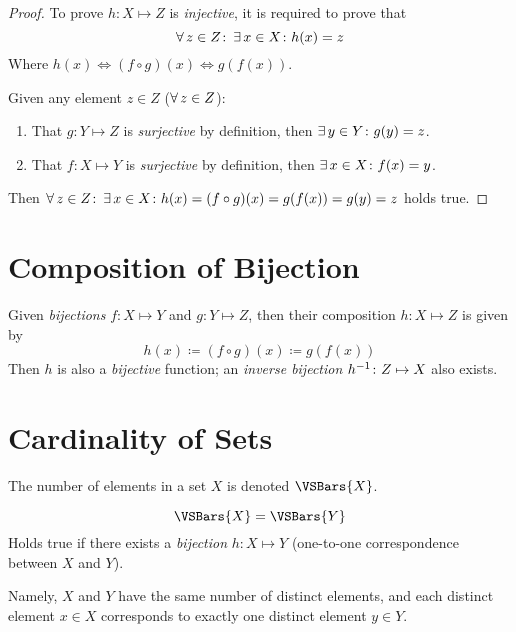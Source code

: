 \begin{proof}
    To prove $h \colon X \mapsto Z$ is \textit{injective}, it is required to prove that
    \begin{equation}
        \operatorname{\forall} z \in Z \colon \operatorname{\exists} x \in X \colon h(x) = z
    \end{equation}
    Where $h(x) \Leftrightarrow (f \circ g)(x) \Leftrightarrow g(f(x))$.
    
    Given any element $z \in Z$ ($\operatorname{\forall} z \in Z$):
    \begin{enumerate}
        \item That $g \colon Y \mapsto Z$ is \textit{surjective} by definition, then $\operatorname{\exists} y \in Y \colon g(y) = z$.
        \item That $f \colon X \mapsto Y$ is \textit{surjective} by definition, then $\operatorname{\exists} x \in X \colon f(x) = y$.
    \end{enumerate}
    Then $\operatorname{\forall} z \in Z \colon \operatorname{\exists} x \in X \colon h(x) = (f \circ g)(x) = g(f(x)) = g(y) = z$ holds true.
\end{proof}

\section{Composition of Bijection}
\begin{proposition}
    Given \textit{bijections} $f \colon X \mapsto Y$ and $g \colon Y \mapsto Z$, then their composition $h \colon X \mapsto Z$ is given by
    \begin{equation}
        h(x) \coloneqq (f \circ g)(x) \coloneqq g(f(x))
    \end{equation}
    Then $h$ is also a \textit{bijective} function; an \textit{inverse bijection} ${h}^{-1} \colon Z \mapsto X$ also exists.
\end{proposition}

\section{Cardinality of Sets}
\begin{definition}[Cardinality]
    The number of elements in a set $X$ is denoted $\VSBars{X}$.
\end{definition}

\begin{definition}
    \begin{equation}
        \VSBars{X} = \VSBars{Y}
    \end{equation}
    Holds true if there exists a \textit{bijection} $h \colon X \mapsto Y$ (one-to-one correspondence between $X$ and $Y$).
    
    Namely, $X$ and $Y$ have the same number of distinct elements, and each distinct element $x \in X$ corresponds to exactly one distinct element $y \in Y$.
\end{definition}

